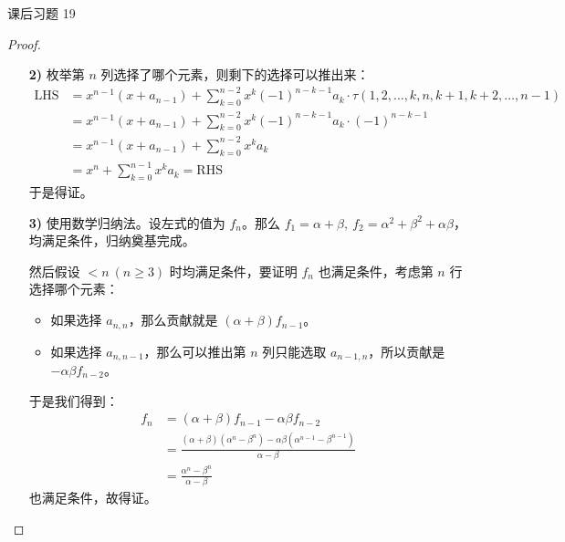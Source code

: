\begin{problem}
	课后习题 19
	\begin{proof}
		\begin{enumerate}
			\item[\textbf{2)}] 枚举第 $n$ 列选择了哪个元素，则剩下的选择可以推出来：
			$$
			\begin{aligned}
				\text{LHS} & = x^{n-1}(x + a_{n-1}) + \sum_{k=0}^{n-2} x^k (-1)^{n-k-1} a_k \cdot \tau(1,2,\dots,k,n,k+1,k+2,\dots,n-1) \\
				& = x^{n-1}(x + a_{n-1}) + \sum_{k=0}^{n-2} x^k (-1)^{n-k-1} a_k \cdot (-1)^{n-k-1} \\
				& = x^{n-1}(x + a_{n-1}) + \sum_{k=0}^{n-2} x^k a_k \\
				& = x^n + \sum_{k=0}^{n-1} x^k a_k = \text{RHS}
			\end{aligned}
			$$
			于是得证。

			\item[\textbf{3)}] 使用数学归纳法。设左式的值为 $f_n$。那么 $f_1 = \alpha + \beta,\ f_2 = \alpha^2 + \beta^2 + \alpha \beta$，均满足条件，归纳奠基完成。
			
			然后假设 $<n\ (n \ge 3)$ 时均满足条件，要证明 $f_n$ 也满足条件，考虑第 $n$ 行选择哪个元素：
			
			\begin{itemize}
				\item 如果选择 $a_{n,n}$，那么贡献就是 $(\alpha + \beta) f_{n-1}$。
				\item 如果选择 $a_{n,n-1}$，那么可以推出第 $n$ 列只能选取 $a_{n-1,n}$，所以贡献是 $-\alpha \beta f_{n-2}$。
			\end{itemize}

			于是我们得到：
			$$
			\begin{aligned}
				f_n & = (\alpha + \beta) f_{n-1} - \alpha \beta f_{n-2} \\
				& = \frac{(\alpha + \beta) (\alpha^n - \beta ^n) - \alpha \beta (\alpha^{n-1} - \beta^{n-1})}{\alpha - \beta} \\
				& = \frac{\alpha^n - \beta^n}{\alpha - \beta}
			\end{aligned}
			$$
			也满足条件，故得证。
		\end{enumerate}
	\end{proof}
\end{problem}

